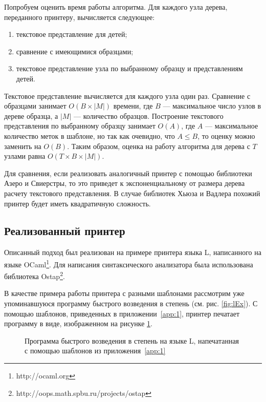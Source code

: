 Попробуем оценить время работы алгоритма. Для каждого узла дерева, переданного принтеру, вычисляется следующее:
\begin{enumerate}
	\item текстовое представление для детей;
	\item сравнение с имеющимися образцами;
	\item текстовое представление узла по выбранному образцу и представлениям детей.
\end{enumerate}

Текстовое представление вычисляется для каждого узла один раз. Сравнение с образцами занимает $O(B \times |M|)$ времени, где $B$ --- максимальное число узлов в дереве образца, а $|M|$ --- количество образцов. Построение текстового представления по выбранному образцу занимает $O(A)$, где $A$ --- максимальное количество меток в шаблоне, но так как очевидно, что $A \leq B$, то оценку можно заменить на $O(B)$. Таким образом, оценка на работу алгоритма для дерева с $T$ узлами равна $O(T \times B \times |M|)$.

Для сравнения, если реализовать аналогичный принтер с помощью библиотеки Азеро и Свиерстры, то это приведет к экспоненциальному от размера дерева расчету текстового представления. В случае библиотек Хьюза и Вадлера похожий принтер будет иметь квадратичную сложность.

\subsection{Реализованный принтер}

Описанный подход был реализован на примере принтера языка L, написанного на языке OCaml\footnote{http://ocaml.org}. Для написания синтаксического анализатора была использована библиотека Ostap\footnote{http://oops.math.spbu.ru/projects/ostap}.

В качестве примера работы принтера с разными шаблонами рассмотрим уже упоминавшуюся программу быстрого возведения в степень (см. рис. \ref{fig:lEx}).
С помощью шаблонов, приведенных в приложении~\ref{app:1}, принтер печатает программу в виде, изображенном на рисунке \ref{fig:firstTemplatePow}.

\begin{figure}[h!]
	
	\caption{Программа быстрого возведения в степень на языке L, напечатанная с помощью шаблонов из приложения~\ref{app:1}}
	\label{fig:firstTemplatePow}
\end{figure}

